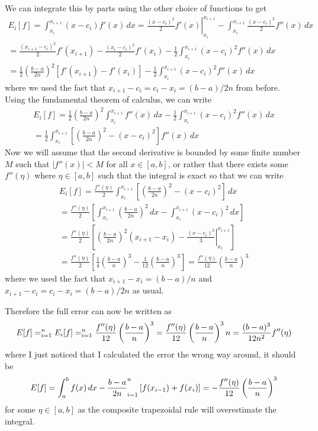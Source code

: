 \documentclass[11pt]{article}
\let\sumop\relax
\begin{document}
We can integrate this by parts using the other choice of functions to get
\begin{multline*}
  E_i[f] = \int_{x_i}^{x_{i+1}} (x-c_i) f'(x) \, dx
  = \left. \frac{(x-c_i)^2}{2} f'(x) \right\rvert_{x_i}^{x_{i+1}} - \int_{x_i}^{x_{i+1}} \frac{(x-c_i)^2}{2} f''(x) \, dx \\
  =  \frac{(x_{i+1}-c_i)^2}{2} f'(x_{i+1}) -  \frac{(x_i-c_i)^2}{2} f'(x_i)
  	- \frac{1}{2} \int_{x_i}^{x_{i+1}} (x-c_i)^2 f''(x) \, dx \\
  = \frac{1}{2} \left(\frac{b-a}{2n} \right)^2 \left[ f'(x_{i+1}) - f'(x_i) \right] - \frac{1}{2} \int_{x_i}^{x_{i+1}} (x-c_i)^2 f''(x) \, dx 
\end{multline*}
where we used the fact that $x_{i+1} - c_i = c_i - x_i = (b-a)/2n$ from before. Using the fundamental theorem of calculus, we can write
\begin{multline*}
  E_i[f] = \frac{1}{2} \left(\frac{b-a}{2n} \right)^2 \int_{x_i}^{x_{i+1}} f''(x) \, dx - \frac{1}{2} \int_{x_i}^{x_{i+1}} (x-c_i)^2 f''(x) \, dx  \\
  = \frac{1}{2} \int_{x_i}^{x_{i+1}} \left[ \left(\frac{b-a}{2n} \right)^2 - (x-c_i)^2 \right] f''(x) \, dx
\end{multline*}
Now we will assume that the second derivative is bounded by some finite number $M$ such that $|f''(x)| < M$ for all $x \in [a,b]$, or rather that there exists some $f''(\eta)$ where $\eta \in [a,b]$ such that the integral is exact so that we can write
\begin{multline*}
  E_i[f] = \frac{f''(\eta)}{2} \int_{x_i}^{x_{i+1}} \left[ \left(\frac{b-a}{2n} \right)^2 - (x-c_i)^2 \right] \, dx \\
    = \frac{f''(\eta)}{2} \left[ \int_{x_i}^{x_{i+1}} \left(\frac{b-a}{2n} \right)^2 \, dx - \int_{x_i}^{x_{i+1}} (x-c_i)^2 \, dx \right] \\
    = \frac{f''(\eta)}{2} \left[ \left(\frac{b-a}{2n} \right)^2 (x_{i+1} - x_i) - \left. \frac{(x-c_i)^3}{3} \right\rvert_{x_i}^{x_{i+1}} \right] \\
    = \frac{f''(\eta)}{2} \left[ \frac{1}{4} \left(\frac{b-a}{n} \right)^3 - \frac{1}{12} \left(\frac{b-a}{n} \right)^3 \right]
    = \frac{f''(\eta)}{12} \left(\frac{b-a}{n} \right)^3
\end{multline*}
where we used the fact that $x_{i+1} - x_i = (b-a)/n$ and $x_{i+1} - c_i = c_i - x_i = (b-a)/2n$ as usual.

Therefore the full error can now be written as
\begin{equation*}
  E[f] = \sumop_{i=1}^n E_i[f]
  = \sumop_{i=1}^n \frac{f''(\eta)}{12} \left(\frac{b-a}{n} \right)^3
  = \frac{f''(\eta)}{12} \left(\frac{b-a}{n} \right)^3 n
  = \frac{(b-a)^3}{12n^2} f''(\eta)
\end{equation*}
where I just noticed that I calculated the error the wrong way around, it should be
\begin{equation}
  E[f] = \int_a^b f(x) \, dx - \frac{b-a}{2n} \sumop_{i=1}^n \left[ f(x_{i-1}) + f(x_i) \right] = -\frac{f''(\eta)}{12} \left(\frac{b-a}{n} \right)^3
\end{equation}
for some $\eta \in [a,b]$ as the composite trapezoidal rule will overestimate the integral.
\end{document}
